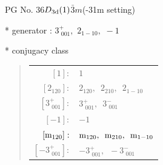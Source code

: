 \documentclass[fleqn,8pt]{jsarticle}
\begin{document}
\setcounter{MaxMatrixCols}{32}

\renewcommand{\tablename}{Table~}
\renewcommand{\figurename}{Figure~}
\begin{center}
\LARGE
PG No. 36\quad$D_{\rm 3d}(1)$\quad$\bar{3}m$\quad(-31m setting)\quad[ trigonal ]
\end{center}

* generator : $3^{+}_{\,\,001},\,\,2{}_{1-10},\,\,-1$

* conjugacy class
\begin{quote}
\begin{tabular}{rl}
$ [1]: $ & $ 1 $ \\
$ [2{}_{120}]: $ & $ 2{}_{120},\,\,\,2{}_{210},\,\,\,2{}_{1-10} $ \\
$ [3^{+}_{\,\,001}]: $ & $ 3^{+}_{\,\,001},\,\,\,3^{-}_{\,\,001} $ \\
$ [-1]: $ & $ -1 $ \\
$ [{\rm m}_{120}]: $ & $ {\rm m}_{120},\,\,\,{\rm m}_{210},\,\,\,{\rm m}_{1-10} $ \\
$ [-3^{+}_{\,\,001}]: $ & $ -3^{+}_{\,\,001},\,\,\,-3^{-}_{\,\,001} $
\end{tabular}
\end{quote}
\end{document}
